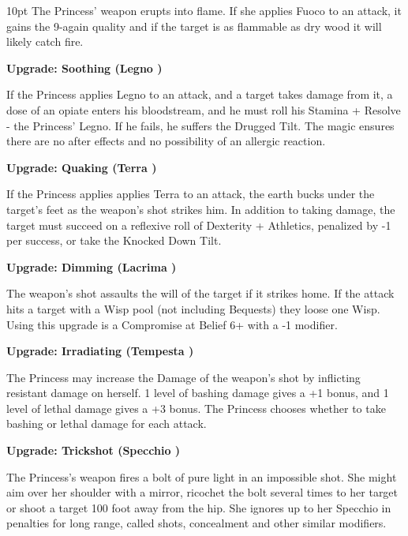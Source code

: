\begin{myindentpar}{10pt}
The Princess' weapon erupts into flame. If she applies Fuoco to an attack, it gains the 9-again quality and if the target is as flammable as dry wood it will likely catch fire. 

\textbf{Upgrade: Soothing (Legno \textbullet\textbullet)}

If the Princess applies Legno to an attack, and a target takes damage from it, a dose of an opiate enters his bloodstream, and he must roll his Stamina + Resolve - the Princess' Legno. If he fails, he suffers the Drugged Tilt. The magic ensures there are no after effects and no possibility of an allergic reaction. 

\textbf{Upgrade: Quaking (Terra \textbullet\textbullet)} 

If the Princess applies applies Terra to an attack, the earth bucks under the target's feet as the weapon's shot strikes him. In addition to taking damage, the target must succeed on a reflexive roll of Dexterity + Athletics, penalized by -1 per success, or take the Knocked Down Tilt.

\textbf{Upgrade: Dimming (Lacrima \textbullet\textbullet)}

The weapon's shot assaults the will of the target if it strikes home. If the attack hits a target with a Wisp pool (not including Bequests) they loose one Wisp. Using this upgrade is a Compromise at Belief 6+ with a -1 modifier.

\textbf{Upgrade: Irradiating (Tempesta \textbullet\textbullet)}

The Princess may increase the Damage of the weapon's shot by inflicting resistant damage on herself. 1 level of bashing damage gives a +1 bonus, and 1 level of lethal damage gives a +3 bonus. The Princess chooses whether to take bashing or lethal damage for each attack.

\textbf{Upgrade: Trickshot (Specchio \textbullet\textbullet)}

The Princess's weapon fires a bolt of pure light in an impossible shot. She might aim over her shoulder with a mirror, ricochet the bolt several times to her target or shoot a target 100 foot away from the hip. She ignores up to her Specchio in penalties for long range, called shots, concealment and other similar modifiers.\end{myindentpar}

